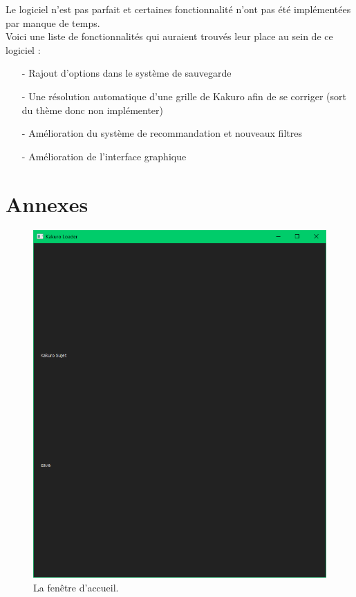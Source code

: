 \documentclass[french,12pt]{article}
\begin{document}
Le logiciel n'est pas parfait et certaines fonctionnalité n'ont pas été implémentées par manque de temps. \\
Voici une liste de fonctionnalités qui auraient trouvés leur place au sein de ce logiciel : \\

\begin{enumerate}
	\item[-] Rajout d'options dans le système de sauvegarde
	\item[-] Une résolution automatique d'une grille de Kakuro afin de se corriger (sort du thème donc non implémenter)
	\item[-] Amélioration du système de recommandation et nouveaux filtres
	\item[-] Amélioration de l'interface graphique
\end{enumerate}

\newpage
\section{Annexes}


\begin{figure}[ht]
  \begin{center}
    \includegraphics[width=\textwidth]{./ressources/acceuil.png} 
  \end{center}
  \caption{La fenêtre d'accueil.}
\end{figure}
\end{document}
